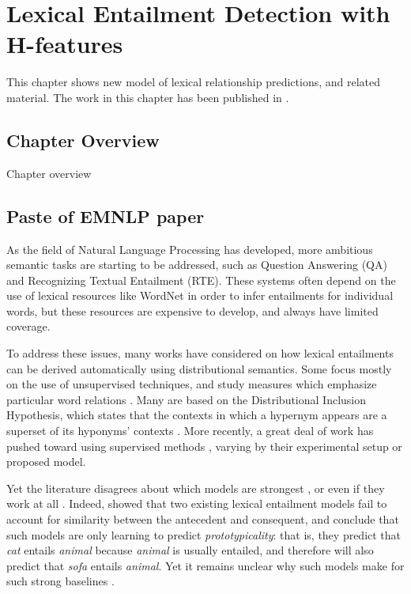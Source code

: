 \chapter{Lexical Entailment Detection with H-features}
\label{ch:hpm}

This chapter shows new model of lexical relationship predictions, and related
material. The work in this chapter has been published in
.

\section{Chapter Overview}

Chapter overview

\section{Paste of EMNLP paper}

As the field of Natural Language Processing has developed, more ambitious
semantic tasks are starting to be addressed, such as Question Answering (QA) and
Recognizing Textual Entailment (RTE). These systems often depend on the use of
lexical resources like WordNet in order to infer entailments
for individual words, but these resources are expensive to develop,
and always have limited coverage.

To address these issues, many works have considered on how lexical entailments can
be derived automatically using distributional semantics. Some focus
mostly on the use of unsupervised techniques, and study measures which emphasize
particular word relations \cite{baroni:2011:gems}. Many are based
on the Distributional Inclusion Hypothesis, which states that the contexts in
which a hypernym appears are a superset of its hyponyms' contexts
\cite{zhitomirskygeffet:2005:acl,kotlerman:2010:nle}.
More recently, a great deal of work has pushed toward using supervised methods
\cite{baroni:2012:eacl,roller:2014:coling,weeds:2014:coling,levy:2015:naacl,kruszewski:2015:tacl},
varying by their experimental setup or proposed model.

Yet the literature disagrees about which models are strongest \cite{weeds:2014:coling,roller:2014:coling}, or even if they
work at all \cite{levy:2015:naacl}.
Indeed,  showed that two existing lexical entailment
models fail to account for similarity between the antecedent and
consequent, and conclude that such models are only learning to predict
{\em prototypicality}: that is, they predict that {\em cat} entails {\em animal}
because {\em animal} is usually entailed, and therefore will also predict
that {\em sofa} entails {\em animal}. Yet it remains unclear why such models
make for such strong baselines
\cite{weeds:2014:coling,kruszewski:2015:tacl,levy:2015:naacl}.

